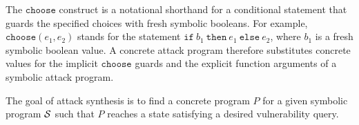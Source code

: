 The $\mathtt{choose}$ construct is a notational shorthand for a conditional statement that guards the specified choices with fresh
symbolic booleans. For example, $\mathtt{choose}(e_1, e_2)$ stands for the statement $\mathtt{if}\ b_1\ \mathtt{then}\ e_1\
\mathtt{else}\ e_2$, where $b_1$ is a fresh symbolic boolean value. A concrete
attack program therefore substitutes concrete values for the implicit $\mathtt{choose}$ guards and the
explicit function arguments of a symbolic attack program. 



% 

% 




The goal of attack synthesis is to  
find a concrete program $P$ for a given symbolic program $\mathcal{S}$ 
such that $P$ reaches a state satisfying a desired vulnerability query.


